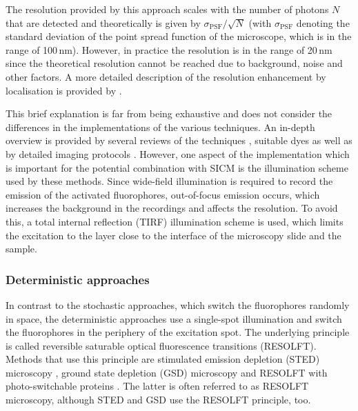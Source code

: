 The resolution provided by this approach scales with the number of photons $N$
that are detected and theoretically is given by $\sigma_\text{PSF}/\sqrt{N}$
(with $\sigma_\text{PSF}$ denoting the standard deviation of the point spread
function of the microscope, which is in the range of 100\,nm). However, in
practice the resolution is in the range of 20\,nm \cite{Betzig2006,Rust2006}
since the theoretical resolution cannot be reached due to background, noise
and other factors. A more detailed description of the resolution enhancement
by localisation is provided by \cite{Mortensen2010}. 

This brief explanation is far from being exhaustive and does not consider the
differences in the implementations of the various techniques. An in-depth
overview is provided by several reviews of the techniques
\cite{Patterson2010,Sengupta2014,Liu2015,Sauer2017}, suitable dyes
\cite{Li2018a} as well as by detailed imaging protocols
\cite{Gould2009,Schermelleh2010,Linde2011}. However, one aspect of the
implementation which is important for the potential combination with SICM is
the illumination scheme used by these methods. Since wide-field illumination
is required to record the emission of the activated fluorophores, out-of-focus
emission occurs, which increases the background in the recordings and affects
the resolution. To avoid this, a total internal reflection (TIRF) illumination
scheme \cite{AMBROSE1956,Axelrod1981} is used, which limits the excitation to
the layer close to the interface of the microscopy slide and the sample.   


\subsubsection{Deterministic approaches}
\label{sec:deterministic-approaches}
In contrast to the stochastic approaches, which switch the fluorophores
randomly in space, the deterministic approaches use a single-spot illumination
and switch the fluorophores in the periphery of the excitation spot. The
underlying principle is called reversible saturable optical fluorescence
transitions (RESOLFT). Methods that use this principle are stimulated emission
depletion (STED) microscopy \cite{hell+wichmann,Klar2000}, ground state
depletion (GSD) microscopy \cite{Hell1995,Bretschneider2007} and RESOLFT with
photo-switchable proteins \cite{Hofmann2005}. The latter is often referred to
as RESOLFT microscopy, although STED and GSD use the RESOLFT principle, too. 

